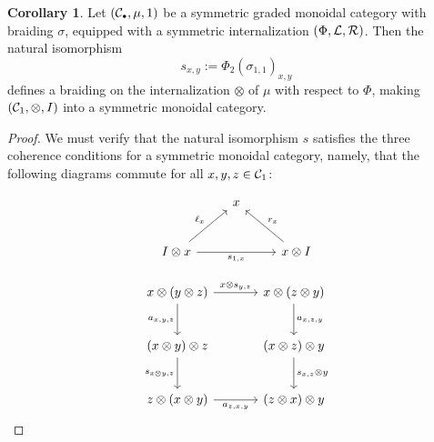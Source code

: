 \documentclass[openany, amssymb, psamsfonts]{amsart}
\theoremstyle{definition}
\newtheorem{cor}{Corollary}[section]
\numberwithin{equation}{section}
\begin{document}
\begin{cor} \label{cor:symmetric_internalization}
Let $(\C_\sbull, \mu, 1)$ be a symmetric graded monoidal category with braiding $\sigma$, equipped with a symmetric internalization $(\Phi, \mathcal{L}, \mathcal{R})$. Then the natural isomorphism
\begin{equation*}
    s_{x, y} := \Phi_2 (\sigma_{1, 1})_{x, y}
\end{equation*} defines a braiding on the internalization $\otimes$ of $\mu$ with respect to $\Phi$, making $(\mathcal{C}_1, \otimes, I)$ into a symmetric monoidal category.
\end{cor}
\begin{proof}
We must verify that the natural isomorphism $s$ satisfies the three coherence conditions for a symmetric monoidal category, namely, that the following diagrams commute for all $x, y, z \in \mathcal{C}_1$:

\begin{equation}\label{dgm:braiding_1}
    \begin{tikzcd}[row sep = 2.5em]
        & x &\\
        I \otimes x \ar[ur, "\ell_x"] \ar[rr, "s_{1, x}"'] && x \otimes I \ar[ul, "r_x"']
    \end{tikzcd}
\end{equation}

\begin{equation} \label{dgm:braiding_2}
    \begin{tikzcd}[row sep = 2.5em, column sep = 3.5em]
        x \otimes (y \otimes z) \ar[r, "{x \otimes s_{y, z}}"] \ar[d, "{a_{x, y, z}}"'] & x \otimes (z \otimes y) \ar[d, "{a_{x, z, y}}"]\\
        (x \otimes y) \otimes z \ar[d, "{s_{x \otimes y, z}}"'] & (x \otimes z) \otimes y \ar[d, "{s_{x, z} \otimes y}"]\\
        z \otimes (x \otimes y) \ar[r, "{a_{z, x, y}}"'] & (z \otimes x) \otimes y
    \end{tikzcd}
\end{equation}


\end{proof}
\end{document}
